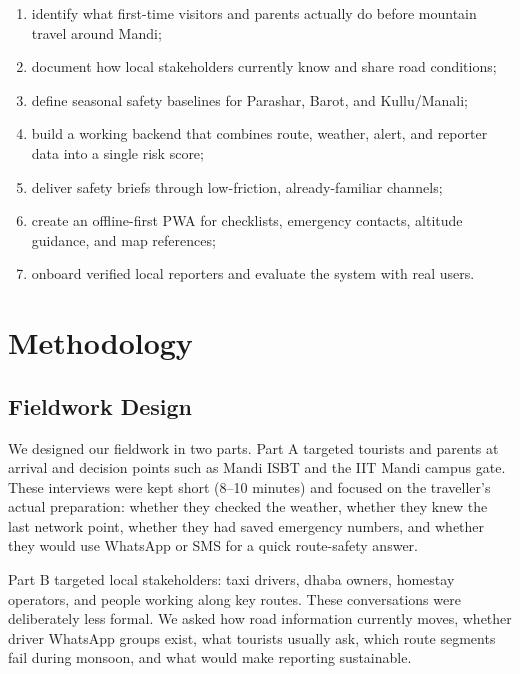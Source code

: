 \documentclass[12pt,a4paper]{article}
\begin{document}
\begin{enumerate}
  \item identify what first-time visitors and parents actually do before mountain travel around Mandi;
  \item document how local stakeholders currently know and share road conditions;
  \item define seasonal safety baselines for Parashar, Barot, and Kullu/Manali;
  \item build a working backend that combines route, weather, alert, and reporter data into a single risk score;
  \item deliver safety briefs through low-friction, already-familiar channels;
  \item create an offline-first PWA for checklists, emergency contacts, altitude guidance, and map references;
  \item onboard verified local reporters and evaluate the system with real users.
\end{enumerate}

\section{Methodology}

\subsection{Fieldwork Design}

We designed our fieldwork in two parts. Part A targeted tourists and parents at arrival and decision points such as Mandi ISBT and the IIT Mandi campus gate. These interviews were kept short (8--10 minutes) and focused on the traveller's actual preparation: whether they checked the weather, whether they knew the last network point, whether they had saved emergency numbers, and whether they would use WhatsApp or SMS for a quick route-safety answer.

Part B targeted local stakeholders: taxi drivers, dhaba owners, homestay operators, and people working along key routes. These conversations were deliberately less formal. We asked how road information currently moves, whether driver WhatsApp groups exist, what tourists usually ask, which route segments fail during monsoon, and what would make reporting sustainable.
\end{document}
